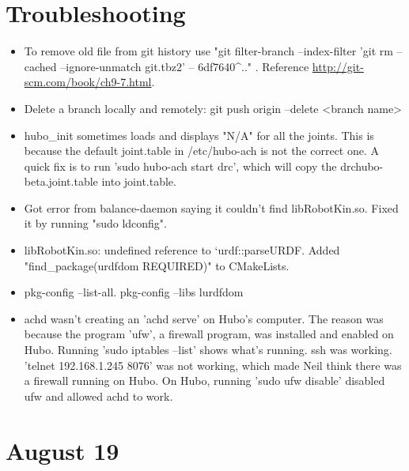 \documentclass[letterpaper, 10 pt]{report}
\begin{document}
\section*{Troubleshooting}
\begin{itemize}
\item To remove old file from git history use "git filter-branch --index-filter 'git rm --cached --ignore-unmatch git.tbz2' -- 6df7640\string^.." . Reference \url{http://git-scm.com/book/ch9-7.html}.
\item Delete a branch locally and remotely: git push origin --delete <branch name>
\item hubo\_init sometimes loads and displays "N/A" for all the joints. This is because the default joint.table in /etc/hubo-ach is not the correct one. A quick fix is to run 'sudo hubo-ach start drc', which will copy the drchubo-beta.joint.table into joint.table.
\item Got error from balance-daemon saying it couldn't find libRobotKin.so. Fixed it by running "sudo ldconfig".
\item libRobotKin.so: undefined reference to `urdf::parseURDF. Added "find\_package(urdfdom REQUIRED)" to CMakeLists.
\item pkg-config --list-all. pkg-config --libs lurdfdom
\item achd wasn't creating an 'achd serve' on Hubo's computer. The reason was because the program 'ufw', a firewall program, was installed and enabled on Hubo. Running 'sudo iptables --list' shows what's running. ssh was working. 'telnet 192.168.1.245 8076' was not working, which made Neil think there was a firewall running on Hubo. On Hubo, running 'sudo ufw disable' disabled ufw and allowed achd to work.
\end{itemize}

\section*{August 19}
\end{document}
